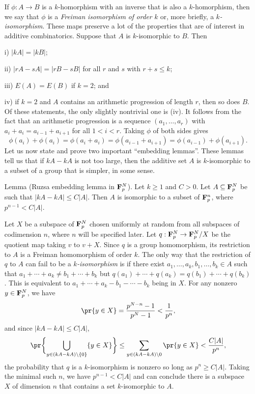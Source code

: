 If $\phi : A\to B$ is a $k$-homorphism with an inverse that is also a $k$-homorphism, then we say that
$\phi$ is a {\it Freiman isomorphism of order $k$} or, more briefly, a {\it $k$-isomorphism}. These
maps preserve a lot of the properties that are of interest in additive combinatorics. Suppose that $A$
is $k$-isomorphic to $B$. Then
\medskip
\item{i)} $|kA| = |kB|$;
\smallskip
\item{ii)} $|rA-sA| = |rB-sB|$ for all $r$ and $s$ with $r+s\le k$;
\smallskip
\item{iii)} $E(A) = E(B)$ if $k=2$; and
\smallskip
\item{iv)} if $k=2$ and $A$ contains an arithmetic progression of length $r$, then so does $B$.
\medskip
Of these statements, the only slightly nontrivial one is (iv). It follows from the fact that an
arithmetic progression is a sequence $(a_1,\ldots,a_r)$ with $a_i+a_i = a_{i-1}+a_{i+1}$ for all $1<i<r$.
Taking $\phi$ of both sides gives
$$\phi(a_i) + \phi(a_i) = \phi(a_i+a_i) = \phi(a_{i-1}+a_{i+1}) = \phi(a_{i-1}) + \phi(a_{i+1}).$$
Let us now state and prove two important ``embedding lemmas''. These lemmas tell us that if
$kA-kA$ is not too large, then the additive set $A$ is $k$-isomorphic to a subset of a group that
is simpler, in some sense.

\parenproclaim Lemma {\advthm} (Ruzsa embedding lemma in ${\bf F}_p^N$). Let $k\ge 1$ and $C>0$.
Let $A\subseteq {\bf F}_p^N$ be such that $|kA-kA|\le C|A|$. Then $A$ is isomorphic to a subset of
${\bf F}_p^n$, where $p^{n-1} < C|A|$.

\proof Let $X$ be a subspace of ${\bf F}_p^N$ chosen uniformly at random from all subspaces of
codimension $n$, where $n$ will be specified later. Let $q : {\bf F}_p^N \to {\bf F}_p^N/X$ be the
quotient map taking $v$ to $v+X$. Since $q$ is a group homomorphism, its restriction to $A$
is a Freiman homomorphism
of order $k$. The only way that the restriction of $q$ to $A$ can fail to be a {\it $k$-isomorphism}
is if there exist $a_1,\ldots,a_k,b_1,\ldots,b_k\in A$ such that $a_1+\cdots+a_k \ne b_1+\cdots+b_k$
but $q(a_1)+ \cdots + q(a_k) = q(b_1)+\cdots+q(b_k)$. This is equivalent to
$a_1+\cdots+a_k - b_1-\cdots-b_k$ being in $X$. For any nonzero $y\in {\bf F}_p^N$, we have
$$\pr\{y\in X\} = {p^{N-n}-1\over p^N-1} < {1\over p^n},$$
and since $|kA-kA|\le C|A|$,
$$\pr\biggl\{\bigcup_{y\in (kA-kA)\setminus\{0\}} \{y\in X\}\biggr\} \le \sum_{y\in (kA-kA)\setminus 0}
\pr\{y\in X\} < {C|A|\over p^n},$$
the probability that $q$ is a $k$-isomorphism is nonzero so long as $p^n\ge C|A|$. Taking the minimal such $n$,
we have $p^{n-1} < C|A|$ and
can conclude there is a subspace $X$ of dimension $n$ that contains a set $k$-isomorphic to $A$.\slug

